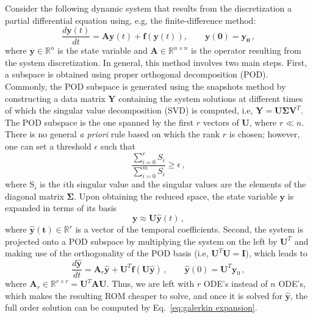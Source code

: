 \documentclass[review,number,sort&compress,12pt]{elsarticle}
\begin{document}
Consider the following dynamic system that results from the discretization a partial differential equation using, e.g, the finite-difference method:
\begin{equation}
\frac{d\mathbf{y}(t)}{dt} = \mathbf{A}\mathbf{y}(t) + \mathbf{f}(\mathbf{y}(t)),  \quad\quad \mathbf{y(0) = \mathbf{y_0}} \, ,
\label{eq:FOM}
\end{equation}
where $\mathbf{y} \in \mathbb{R}^{n}$ is the state variable and $\mathbf{A} \in \mathbb{R}^{n\times n}$ is the operator resulting from the system discretization.
In general, this method involves two main steps.
First, a subspace is obtained using proper orthogonal decomposition (POD)\cite{volkwein2011model}.
Commonly, the POD subspace is generated using the snapshots method \cite{sirovich1987turbulence} by constructing a data matrix $\mathbf{Y}$ containing the system solutions at different times of which the singular value decomposition (SVD) is computed, i.e, $\mathbf{Y} = \mathbf{U}\mathbf{\Sigma}\mathbf{V}^T$.
The POD subspace is the one spanned by the first $r$ vectors of $\mathbf{U}$, where $r \ll n$.
There is no general \textit{a priori} rule based on which the rank $r$ is chosen; however, one can set a threshold $\epsilon$  such that
\begin{equation}
\frac{\sum_{i=0}^r S_i}{\sum_{i=0}^m S_i} \ge \epsilon \, ,
\end{equation}
where S$_i$ is the $i$th singular value and the singular values are the elements of the diagonal matrix $\mathbf{\Sigma}$.
Upon obtaining the reduced space, the state variable $\mathbf{y}$ is expanded in terms of its basis
\begin{equation}
\mathbf{y} \approx \mathbf{U} \hat{\mathbf{y}}(t) \, ,
\label{eq:galerkin expansion}
\end{equation}
where $\mathbf{\hat{y}(t)} \in \mathbb{R}^{r}$ is a vector of the temporal coefficients.
Second, the system is projected onto a POD subspace by multiplying the system on the left by $\mathbf{U}^T$ and making use of the orthogonality of the POD basis (i.e, $\mathbf{U}^T\mathbf{U} = \mathbf{I}$), which leads to
\begin{equation}
\frac{d\mathbf{\hat{y}}}{dt} = \mathbf{A}_r\mathbf{\hat{y}} + \mathbf{U}^T\mathbf{f}(\mathbf{U}\mathbf{\hat{y}})\, ,  \qquad \mathbf{\hat{y}}(0) = \mathbf{U}^T\mathbf{y}_0 \, ,
\label{eq:ROM}
\end{equation}
where $\mathbf{A}_r \in \mathbb{R}^{r\times r} = \mathbf{U}^T\mathbf{A}\mathbf{U}.$
Thus, we are left with $r$ ODE's instead of $n$ ODE's, which makes the resulting ROM cheaper to solve, and once it is solved for $\mathbf{\hat{y}}$, the full order solution can be computed by Eq.~\ref{eq:galerkin expansion}.
\end{document}
